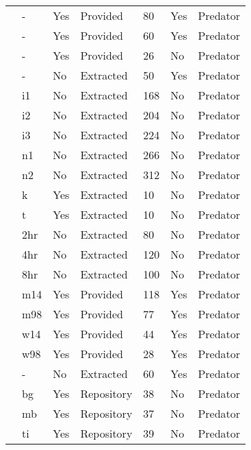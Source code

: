\begin{longtable}{lllllll}
\citet{Prokopenko:2017aa}&-&Yes&Provided&80&Yes&Predator\tabularnewline
\citet{Pusack:2018aa}&-&Yes&Provided&60&Yes&Predator\tabularnewline
\citet{Reeve:1997aa}&-&Yes&Provided&26&No&Predator\tabularnewline
\citet{Salt:1974aa}&-&No&Extracted&50&Yes&Predator\tabularnewline
\citet{Uttley:1980aa}&i1&No&Extracted&168&No&Predator\tabularnewline
\citet{Uttley:1980aa}&i2&No&Extracted&204&No&Predator\tabularnewline
\citet{Uttley:1980aa}&i3&No&Extracted&224&No&Predator\tabularnewline
\citet{Uttley:1980aa}&n1&No&Extracted&266&No&Predator\tabularnewline
\citet{Uttley:1980aa}&n2&No&Extracted&312&No&Predator\tabularnewline
\citet{Vahl:2005aa}&k&Yes&Extracted&10&No&Predator\tabularnewline
\citet{Vahl:2005aa}&t&Yes&Extracted&10&No&Predator\tabularnewline
\citet{Von-Westernhagen:1976aa}&2hr&No&Extracted&80&No&Predator\tabularnewline
\citet{Von-Westernhagen:1976aa}&4hr&No&Extracted&120&No&Predator\tabularnewline
\citet{Von-Westernhagen:1976aa}&8hr&No&Extracted&100&No&Predator\tabularnewline
\citet{Vucetich:2002aa}&m14&Yes&Provided&118&Yes&Predator\tabularnewline
\citet{Vucetich:2002aa}&m98&Yes&Provided&77&Yes&Predator\tabularnewline
\citet{Vucetich:2002aa}&w14&Yes&Provided&44&Yes&Predator\tabularnewline
\citet{Vucetich:2002aa}&w98&Yes&Provided&28&Yes&Predator\tabularnewline
\citet{Walde:1984aa}&-&No&Extracted&60&Yes&Predator\tabularnewline
\citet{Wasserman:2016aa,Wasserman:2016ab}&bg&Yes&Repository&38&No&Predator\tabularnewline
\citet{Wasserman:2016aa,Wasserman:2016ab}&mb&Yes&Repository&37&No&Predator\tabularnewline
\citet{Wasserman:2016aa,Wasserman:2016ab}&ti&Yes&Repository&39&No&Predator\tabularnewline
\hline
\end{longtable}
